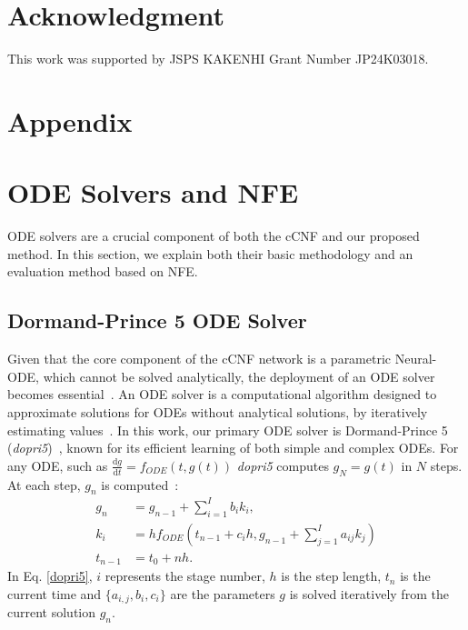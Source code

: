 \documentclass[sn-mathphys-num]{sn-jnl}
\begin{document}
\section*{Acknowledgment}
This work was supported by JSPS KAKENHI Grant Number JP24K03018.

\appendix
\section*{Appendix}
\section{ODE Solvers and NFE}\label{section:dopri5_nfe}
ODE solvers are a crucial component of both the cCNF and our proposed method. In this section, we explain both their basic methodology and an evaluation method based on NFE.
\subsection{Dormand-Prince 5 ODE Solver}
Given that the core component of the cCNF network is a parametric Neural-ODE, which cannot be solved analytically, the deployment of an ODE solver becomes essential~\cite{chen2018neural}. An ODE solver is a computational algorithm designed to approximate solutions for ODEs without analytical solutions, by iteratively estimating values~\cite{dallas2017comparison}. In this work, our primary ODE solver is Dormand-Prince 5 (\textit{dopri5})~\cite{wanner1996solving}, known for its efficient learning of both simple and complex ODEs.
For any ODE, such as $\frac{\mathrm{d}g}{\mathrm{d}t} = f_{ODE}\left(t, g(t)\right)$
 \textit{dopri5} computes $g_N = g(t)$ in $N$ steps.
At each step, $g_{n}$ is computed~\cite{hu2003numerical}:
\begin{align}\label{dopri5}
    g_{n}&=g_{n-1}+\sum^{I}_{i=1}b_i  k_i, \nonumber \\
    k_i&=h f_{ODE}\left(t_{n-1}+c_i h, g_{n-1}+\sum_{j=1}^I a_{i j} k_j\right) \nonumber \\
    t_{n-1} &= t_{0} + nh. 
\end{align}
In Eq. \ref{dopri5}, $i$ represents the stage number, $h$ is the step length, $t_n$ is the current time and $\{a_{i,j}, b_{i}, c_{i} \}$ are the parameters
$g$ is solved iteratively from the current solution $g_n$.
\end{document}

